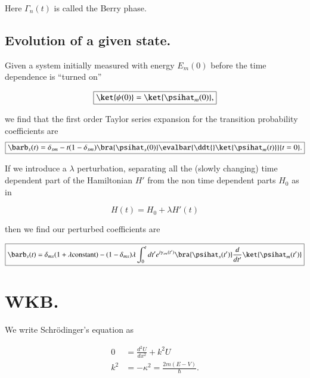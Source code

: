 Here $\Gamma_n(t)$ is called the Berry phase.

\subsection{Evolution of a given state.}

Given a system initially measured with energy $E_m(0)$ before the time dependence is ``turned on''

\begin{equation}\label{eqn:qmTwoReview:650}
\boxed{
\ket{\psi(0)} = \ket{\psihat_m(0)},
}
\end{equation}

we find that the first order Taylor series expansion for the transition probability coefficients are
\begin{equation}\label{eqn:qmTwoReview:890}
\boxed{
\barb_s(t) = \delta_{sm} - t (1 - \delta_{sm}) \bra{\psihat_s(0)} \evalbar{\ddt{} \ket{\psihat_m(t)}}{t=0}.
}
\end{equation}

If we introduce a $\lambda$ perturbation, separating all the (slowly changing) time dependent part of the Hamiltonian $H'$ from the non time dependent parts $H_0$ as in

\begin{equation}\label{eqn:qmTwoReview:910}
H(t) = H_0 + \lambda H'(t)
\end{equation}

then we find our perturbed coefficients are

\begin{equation}\label{eqn:qmTwoReview:930}
\boxed{
\barb_s(t) 
=
\delta_{ms}(1 + \lambda \text{constant})
- 
(1-\delta_{ms}) \lambda
\int_0^t dt'
e^{i \gamma_{sm}(t') } \bra{\psihat_s(t')} \frac{d}{dt'} \ket{\psihat_m(t')} 
}
\end{equation}

\section{WKB.}

We write Schr\"{o}dinger's equation as

\begin{equation}\label{eqn:qmTwoReview:670}
\boxed{
\begin{aligned}
0 &= \frac{d^2 U}{dx^2} + k^2 U \\
k^2 &= -\kappa^2 = \frac{2m (E - V)}{\hbar}.
\end{aligned}
}
\end{equation}

